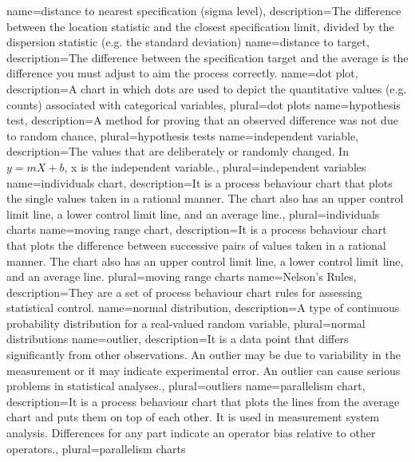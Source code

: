 {
    name={distance to nearest specification (sigma level)},
    description={The difference between the location statistic and the closest specification limit, divided by the dispersion statistic (e.g. the standard deviation)}
}
{
    name={distance to target},
    description={The difference between the specification target and the average is the difference you must adjust to aim the process correctly.}
}
{
    name={dot plot},
    description={A chart in which dots are used to depict the quantitative values (e.g. counts) associated with categorical variables},
    plural={dot plots}
}
{
    name={hypothesis test},
    description={A method for proving that an observed difference was not due to random chance},
    plural={hypothesis tests}
}
{
    name={independent variable},
    description={The values that are deliberately or randomly changed. In $y = mX + b$, x is the independent variable.},
    plural={independent variables}
}
{
    name={individuals chart},
    description={It is a process behaviour chart that plots the single values taken in a rational manner. The chart also has an upper control limit line, a lower control limit line, and an average line.},
    plural={individuals charts}
}
{
    name={moving range chart},
    description={It is a process behaviour chart that plots the difference between successive pairs of values taken in a rational manner. The chart also has an upper control limit line, a lower control limit line, and an average line.}
    plural={moving range charts}
}
{
    name={Nelson's Rules},
    description={They are a set of process behaviour chart rules for assessing statistical control.}
}
{
    name={normal distribution},
    description={A type of continuous probability distribution for a real-valued random variable},
    plural={normal distributions}
}
{
    name={outlier},
    description={It is a data point that differs significantly from other observations. An outlier may be due to variability in the measurement or it may indicate experimental error. An outlier can cause serious problems in statistical analyses.},
    plural={outliers}
}
{
    name={parallelism chart},
    description={It is a process behaviour chart that plots the lines from the average chart and puts them on top of each other. It is used in measurement system analysis. Differences for any part indicate an operator bias relative to other operators.},
    plural={parallelism charts}
}
